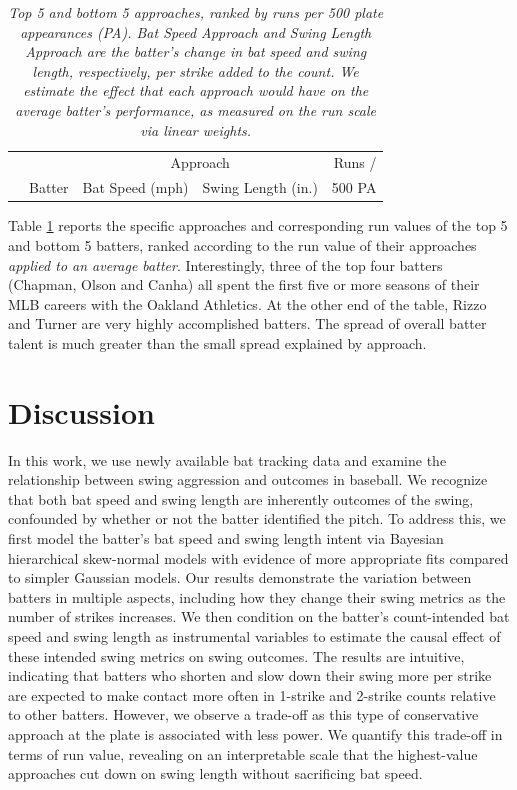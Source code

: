 \documentclass{article}
\begin{document}
      \begin{table}[H]
        \centering
        \begin{tabular}{rl|rr|r}
          &        & \multicolumn{2}{c|}{Approach}          & Runs /\\
          & Batter & Bat Speed (mph)  & Swing Length (in.)  & 500 PA\\
          \hline
          
        \end{tabular}
        \caption{\it Top 5 and bottom 5 approaches, ranked by runs per 500 plate appearances (PA). Bat Speed Approach and Swing Length Approach are the batter's change in bat speed and swing length, respectively, per strike added to the count. We estimate the effect that each approach would have on the average batter's performance, as measured on the run scale via linear weights.}
        \label{tab:approach-ranked}
      \end{table}

      Table \ref{tab:approach-ranked} reports the specific approaches and corresponding run values of the top 5 and bottom 5 batters, ranked according to the run value of their approaches {\it applied to an average batter}. Interestingly, three of the top four batters (Chapman, Olson and Canha) all spent the first five or more seasons of their MLB careers with the Oakland Athletics. At the other end of the table, Rizzo and Turner are very highly accomplished batters. The spread of overall batter talent is much greater than the small spread explained by approach.

    
  \section{Discussion}
  \label{sec:discussion}


    In this work, we use newly available bat tracking data and examine the relationship between swing aggression and outcomes in baseball. We recognize that both bat speed and swing length are inherently outcomes of the swing, confounded by whether or not the batter identified the pitch. To address this, we first model the batter's bat speed and swing length intent via Bayesian hierarchical skew-normal models with evidence of more appropriate fits compared to simpler Gaussian models. Our results demonstrate the variation between batters in multiple aspects, including how they change their swing metrics as the number of strikes increases. We then condition on the batter's count-intended bat speed and swing length as instrumental variables to estimate the causal effect of these intended swing metrics on swing outcomes. The results are intuitive, indicating that batters who shorten and slow down their swing more per strike are expected to make contact more often in 1-strike and 2-strike counts relative to other batters. However, we observe a trade-off as this type of conservative approach at the plate is associated with less power. We quantify this trade-off in terms of run value, revealing on an interpretable scale that the highest-value approaches cut down on swing length without sacrificing bat speed. 
\end{document}
